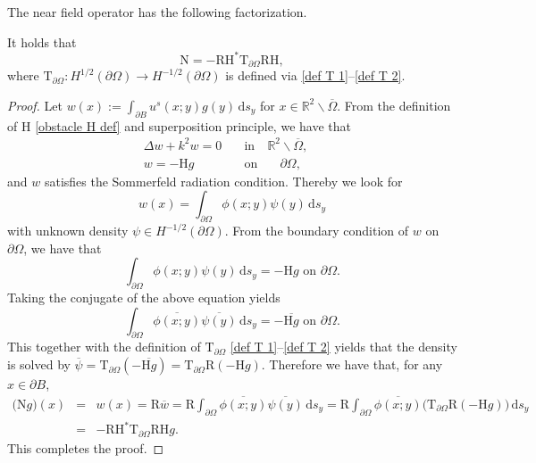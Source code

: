 \documentclass[final]{siamltex}
\newcommand{\ind}{\,\mbox{d}}
\begin{document}
The near field operator has the following factorization.
\begin{theorem} \label{obstacle thm NO factorization}
It holds that
\begin{equation} \label{obstacle NO factorization}
\mathrm{N} = -  \mathrm{R} \mathrm{H}^* \mathrm{T}_{\partial \Omega}  \mathrm{R} \mathrm{H},
\end{equation}
where $ \mathrm{T}_{\partial \Omega}: H^{1/2}(\partial \Omega) \to H^{-1/2}(\partial \Omega)$ is defined via \eqref{def T 1}--\eqref{def T 2}.
\end{theorem}
\begin{proof}
Let $w(x):=\int_{\partial B} u^s(x;y) g(y) \ind s_y$ for $x \in \mathbb{R}^2 \backslash \overline{\Omega}$. From the definition of   $\mathrm{H}$ \eqref{obstacle H def} and superposition principle, we have that
\begin{eqnarray*}
\Delta w + k^2 w = 0 \quad &\mbox{in}& \mathbb{R}^2 \backslash \overline{\Omega}, \quad \\
w = - \mathrm{H} g \quad &\mbox{on}& \quad \partial \Omega,
\end{eqnarray*}
and $w$ satisfies the Sommerfeld radiation condition. Thereby we look for
$$
w(x) = \int_{\partial \Omega}  {\phi(x;y)} \psi(y) \ind s_y
$$
with unknown density $\psi \in H^{-1/2}(\partial \Omega)$. From the boundary condition of $w$ on $\partial \Omega$, we have that
$$
\int_{\partial \Omega}  {\phi(x;y)} \psi(y) \ind s_y = - \mathrm{H} g \mbox{ on } \partial \Omega.
$$
Taking the conjugate of the above equation yields
$$
\int_{\partial \Omega}  \overline{\phi(x;y)} \overline{\psi(y)} \ind s_y = - \overline{\mathrm{H} g} \mbox{ on } \partial \Omega.
$$
This together with the definition of $\mathrm{T}_{\partial \Omega}$ \eqref{def T 1}--\eqref{def T 2} yields that the density is solved by $\overline{\psi}=\mathrm{T}_{\partial \Omega} (- \overline{\mathrm{H} g}) = \mathrm{T}_{\partial \Omega} \mathrm{R}(-  \mathrm{H} g)$. Therefore we have that, for any $x\in \partial B$,
\begin{eqnarray*}
\big( \mathrm{N} g \big) (x) &=& w(x)=\mathrm{R} \overline{w}=\mathrm{R} \int_{\partial \Omega} \overline{\phi(x;y)} \overline{\psi(y)} \ind s_y =\mathrm{R} \int_{\partial \Omega} \overline{\phi(x;y)} \big(\mathrm{T}_{\partial \Omega}  \mathrm{R}(- \mathrm{H} g) \big) \ind s_y \\
&=& - \mathrm{R} \mathrm{H}^* \mathrm{T}_{\partial \Omega} \mathrm{R} \mathrm{H} g.
\end{eqnarray*}
This completes the proof.
\end{proof}
\end{document}
